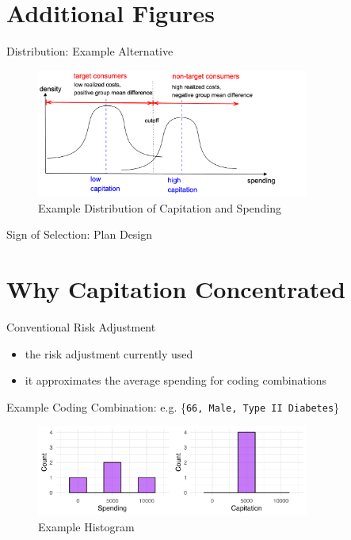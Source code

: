 \section{Additional Figures}

\begin{frame}[label=example_alternative]{Distribution: Example Alternative}
    \begin{figure}
        \includegraphics[width=0.8\textwidth]{figures/images/example_2.png}
        \caption{Example Distribution of Capitation and Spending}
    \end{figure}
    \hyperlink{example_distribution}{}
\end{frame}

\begin{frame}[label=version2]{Sign of Selection: Plan Design}
    
    \hyperlink{version1}{}
\end{frame}

\section{Why Capitation Concentrated}

\begin{frame}[label=example_start]{Conventional Risk Adjustment}
    \begin{itemize}
        \item the risk adjustment currently used
        \item it approximates the average spending for coding combinations
    \end{itemize}
    
\end{frame}

\begin{frame}{Example}
    Coding Combination: e.g. \{\texttt{66, Male, Type II Diabetes}\}
    \begin{figure}
        \centering
        \includegraphics[width=0.8\textwidth]{figures/images/histogram.png}
        \caption{Example Histogram}
    \end{figure}
\end{frame}


